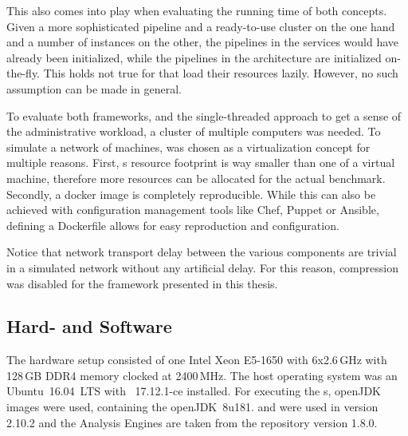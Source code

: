 This also comes into play when evaluating the running time of both concepts. Given a more sophisticated pipeline and a ready-to-use \spark{} cluster on the one hand and a number of \uimaas{} instances on the other, the pipelines in the \uimaas{} services would have already been initialized, while the pipelines in the \spark{} architecture are initialized on-the-fly. This holds not true for \anens{} that load their resources lazily. However, no such assumption can be made in general.

To evaluate both frameworks, and the single-threaded approach to get a sense of the administrative workload, a cluster of multiple computers was needed. To simulate a network of machines, \docker{} was chosen as a virtualization concept for multiple reasons. First, \docker{}s resource footprint is way smaller than one of a virtual machine, therefore more resources can be allocated for the actual benchmark. Secondly, a docker image is completely reproducible. While this can also be achieved with configuration management tools like Chef, Puppet or Ansible, defining a Dockerfile allows for easy reproduction and configuration. 

Notice that network transport delay between the various components are trivial in a simulated network without any artificial delay. For this reason, compression was disabled for the framework presented in this thesis.

\subsection{Hard- and Software}
The hardware setup consisted of one Intel Xeon E5-1650 with 6x2.6\,GHz with 128\,GB DDR4 memory clocked at 2400\,MHz. The host operating system was an Ubuntu~16.04~LTS with \docker{}~17.12.1-ce installed. For executing the \jvm{}s, openJDK \docker{} images were used, containing the openJDK~8u181. \uima{} and \uimaas{} were used in version 2.10.2 and the \dkpro{} Analysis Engines are taken from the repository version 1.8.0.

